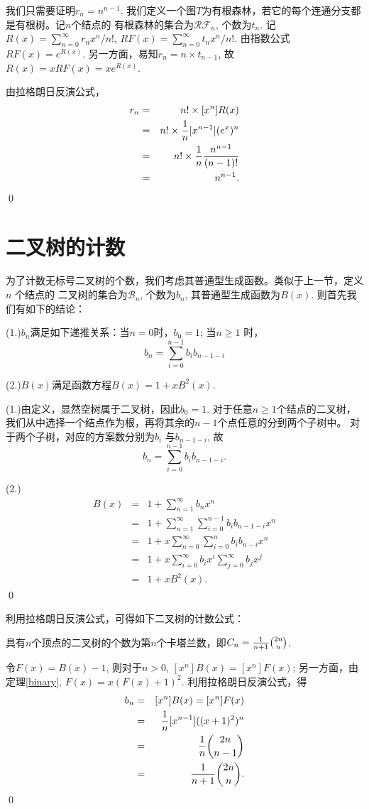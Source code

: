 \documentclass[a4paper,11pt]{article}
\def\pf{\noindent {\bf 证明\ }}
\begin{document}
{
\pf
我们只需要证明$r_n=n^{n-1}$. 我们定义一个图$T$为有根森林，若它的每个连通分支都是有根树。记$n$个结点的
有根森林的集合为$\mathcal{RF}_n$, 个数为$t_n$. 记$R(x)=\sum_{n=0}^\infty r_nx^n/n!$,
$RF(x)=\sum_{n=0}^\infty t_nx^n/n!$. 由指数公式$RF(x)=e^{R(x)}$. 另一方面，易知$r_n=n\times t_{n-1}$, 故$R(x)=xRF(x)=xe^{R(x)}$.

由拉格朗日反演公式，
\begin{eqnarray*}
r_n&=&n!\times[x^n]R(x)\\
&=&n!\times {1\over n}[x^{n-1}](e^x)^n\\
&=&n!\times{1\over n}{n^{n-1}\over (n-1)!}\\
&=&n^{n-1}.
\end{eqnarray*}
\qed
}

\section{二叉树的计数}
为了计数无标号二叉树的个数，我们考虑其普通型生成函数。类似于上一节，定义$n$ 个结点的
二叉树的集合为$\mathcal{B}_n$, 个数为$b_n$,
其普通型生成函数为$B(x)$. 则首先我们有如下的结论： {\thm
\label{binary}

(1.)$b_n$满足如下递推关系：当$n=0$时，$b_0=1$; 当$n\geqslant 1$ 时，
$$b_n=\sum_{i=0}^{n-1}b_ib_{n-1-i}$$


(2.)$B(x)$满足函数方程$B(x)=1+xB^2(x).$

}
{
\pf

(1.)由定义，显然空树属于二叉树，因此$b_0=1$. 对于任意$n\geqslant1$个结点的二叉树，我们从中选择一个结点作为根，再将其余的$n-1$个点任意的分到两个子树中。
对于两个子树，对应的方案数分别为$b_i$ 与$b_{n-1-i}$, 故
$$b_n=\sum_{i=0}^{n-1}b_ib_{n-1-i}.$$

(2.)
\begin{eqnarray*}
B(x)&=&1+\sum_{n=1}^\infty b_nx^n\\
&=&1+\sum_{n=1}^\infty \sum_{i=0}^{n-1}b_ib_{n-1-i}x^n\\
&=&1+x\sum_{n=0}^\infty \sum_{i=0}^{n}b_ib_{n-i}x^{n}\\
&=&1+x\sum_{i=0}^\infty b_ix^i\sum_{j=0}^\infty b_jx^j\\
&=&1+xB^2(x).
\end{eqnarray*}
\qed

}
利用拉格朗日反演公式，可得如下二叉树的计数公式：

具有$n$个顶点的二叉树的个数为第$n$个卡塔兰数，即$C_n={1\over n+1}{2n\choose n}$.

{\pf 令$F(x)=B(x)-1$, 则对于$n>0$, $[x^n]B(x)=[x^n]F(x)$; 另一方面，由定理\ref{binary}, $F(x)=x\left(F(x)+1\right)^2$. 利用拉格朗日反演公式，得
\begin{eqnarray*}
b_n&=&[x^n]B(x)=[x^n]F(x)\\
&=&{1\over n}[x^{n-1}]((x+1)^2)^n\\
&=&{1\over n}{2n\choose n-1}\\
&=&{1\over n+1}{2n\choose n}.
\end{eqnarray*}
\qed
}
\end{document}
